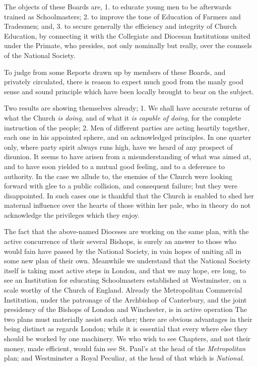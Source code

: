 The objects of these Boards are, 1. to educate
young men to be afterwards trained as Schoolmasters; 2. to improve the
tone of Education of Farmers and Tradesmen; and, 3. to secure generally
the efficiency and integrity of Church Education, by connecting it with
the Collegiate and Diocesan Institutions united under the Primate, who
presides, not only nominally but really, over the counsels of the
National Society.

To judge from some Reports drawn up by members of
these Boards, and privately circulated, there is reason to expect much
good from the manly good sense and sound principle which have been
locally brought to bear on the subject.

Two results are showing themselves already; 1. We
shall have accurate returns of what the Church \emph{is doing}, and of
what it \emph{is capable of doing}, for the complete instruction of the
people; 2. Men of different parties are acting heartily together, each
one in his appointed sphere, and on acknowledged principles. In one
quarter only, where party spirit always runs high, have we heard of any
prospect of disunion. It seems to have arisen from a misunderstanding of
what was aimed at, and to have soon yielded to a mutual good feeling,
and to a deference to authority. In the case we allude to, the enemies
of the Church were looking forward with glee to a public collision, and
consequent failure; but they were disappointed. In such cases one is
thankful that the Church is enabled to shed her maternal influence over
the hearts of those within her pale, who in theory do not acknowledge
the privileges which they enjoy.

The fact that the above-named Dioceses are working
on the same plan, with the active concurrence of their several Bishops,
is surely an answer to those who would fain have passed by the National
Society, in vain hopes of uniting all in some new plan of their own.
Meanwhile we understand that the National Society itself is taking most
active steps in London, and that we may hope, ere long, to see an
Institution for educating Schoolmasters established at Westminster, on a
scale worthy of the Church of England. Already the Metropolitan
Commercial Institution, under the patronage of the Archbishop of
Canterbury, and the joint presidency of the Bishops of London and
Winchester, is in active operation The two plans must materially assist
each other; there are obvious advantages in their being distinct as
regards London; while it is essential that every where else they should
be worked by one machinery. We who wish to see Chapters, and not their
money, made efficient, would fain see St. Paul's at the head of the \emph{Metropolitan}
plan; and Westminster a Royal Peculiar, at the head of that which is \emph{National}.

